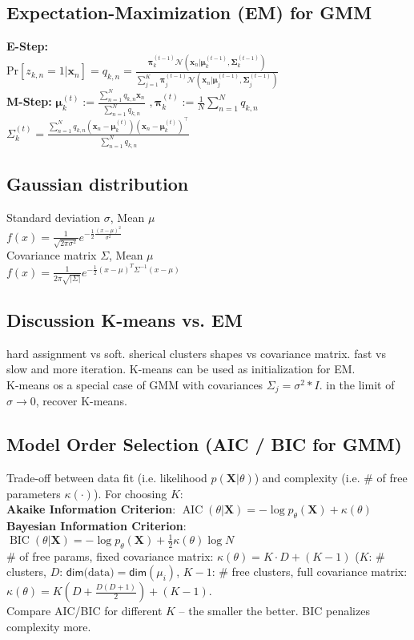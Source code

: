 \subsection*{Expectation-Maximization (EM) for GMM}
\textbf{E-Step: }\\
Pr$[z_{k,n} = 1 | \mathbf{x}_n] = q_{k, n} = \frac{\boldsymbol{\pi}_k^{(t-1)} \mathcal{N}(\mathbf{x}_n | \boldsymbol{\mu}_k^{(t-1)}, \boldsymbol{\Sigma}_k^{(t-1)})}{\sum_{j=1}^K \boldsymbol{\pi}_j^{(t-1)} \mathcal{N}(\mathbf{x}_n | \boldsymbol{\mu}_j^{(t-1)}, \boldsymbol{\Sigma}_j^{(t-1)})}$\\
\textbf{M-Step: } $\boldsymbol{\mu}_k^{(t)} := \frac{\sum_{n=1}^N q_{k,n} \mathbf{x}_n}{\sum_{n=1}^N q_{k,n}}$
$, \boldsymbol{\pi}_k^{(t)} := \frac{1}{N} \sum_{n=1}^N q_{k,n}$\\
$\Sigma_k^{(t)} = \frac{\sum_{n=1}^N q_{k, n} (\mathbf{x}_n - \boldsymbol{\mu}_k^{(t)})(\mathbf{x}_n - \boldsymbol{\mu}_k^{(t)})^\top}{\sum_{n=1}^N q_{k,n}}$

\subsection*{Gaussian distribution}
Standard deviation $\sigma$, Mean $\mu$ \\
$f(x) = \frac{1}{\sqrt{2\pi \sigma^2}} e^{- \frac{1}{2} \frac{(x-\mu)^2}{\sigma^2}}$\\
Covariance matrix $\Sigma$, Mean $\mu$ \\
$f(x) = \frac{1}{2\pi \sqrt{|\Sigma|}} e^{- \frac{1}{2} (x-\mu)^T \Sigma^{-1} (x-\mu)}$

\subsection*{Discussion K-means vs. EM}
hard assignment vs soft. sherical clusters shapes vs covariance matrix. fast vs slow and more iteration. K-means can be used as initialization for EM.\\
K-means os a special case of GMM with covariances $\Sigma_j = \sigma^2 * I$. in the limit of $\sigma \rightarrow 0$, recover K-means.

\subsection*{Model Order Selection (AIC / BIC for GMM)}
Trade-off between data fit (i.e. likelihood $p(\mathbf{X} | \theta)$) and complexity (i.e. \# of free parameters $\kappa(\cdot)$). For choosing $K$:\\
\textbf{Akaike Information Criterion}: $\operatorname{AIC}(\theta | \mathbf{X}) = -\log p_\theta(\mathbf{X}) + \kappa(\theta)$\\
\textbf{Bayesian Information Criterion}: $\operatorname{BIC}(\theta | \mathbf{X}) = -\log p_\theta(\mathbf{X}) + \frac{1}{2} \kappa(\theta) \log N$\\
\# of free params, fixed covariance matrix: $\kappa(\theta) = K \cdot D + (K - 1)$ ($K$: \# clusters, $D$: $\mathsf{dim}\text{(data)}=\mathsf{dim}(\mu_i)$, $K-1$: \# free clusters, full covariance matrix: $\kappa(\theta) = K(D + \frac{D(D+1)}{2}) + (K - 1)$.\\
Compare AIC/BIC for different $K$ -- the smaller the better. BIC penalizes complexity more.
